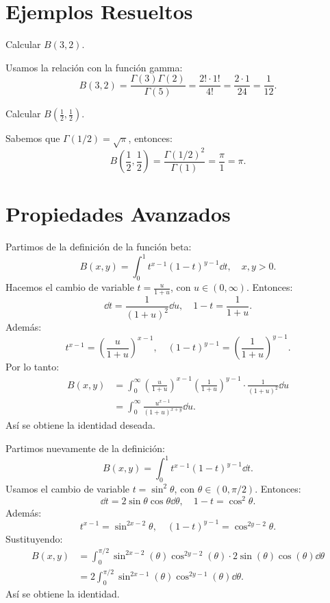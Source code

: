 \section{Ejemplos Resueltos}

\begin{example}
	Calcular \( B(3,2) \).

	Usamos la relación con la función gamma:
	\[
		B(3,2) = \frac{\Gamma(3)\Gamma(2)}{\Gamma(5)} = \frac{2! \cdot 1!}{4!} = \frac{2 \cdot 1}{24} = \frac{1}{12}.
	\]
\end{example}

\begin{example}
	Calcular \( B\left(\frac{1}{2}, \frac{1}{2}\right) \).

	Sabemos que \( \Gamma(1/2) = \sqrt{\pi} \), entonces:
	\[
		B\left(\frac{1}{2}, \frac{1}{2}\right) = \frac{\Gamma(1/2)^2}{\Gamma(1)} = \frac{\pi}{1} = \pi.
	\]
\end{example}

\section{Propiedades Avanzados}
\mprop{}{
	\[
		B(x, y) = \int_0^\infty \frac{t^{x-1}}{(1 + t)^{x+y}} \dd{t}
	\]
}
\begin{myproof}
	Partimos de la definición de la función beta:
	\[
		B(x, y) = \int_0^1 t^{x-1}(1 - t)^{y-1} \dd{t}, \quad x, y > 0.
	\]
	Hacemos el cambio de variable \( t = \frac{u}{1+u} \), con \( u \in (0, \infty) \). Entonces:
	\[
		\dd{t} = \frac{1}{(1+u)^2} \dd{u}, \quad 1 - t = \frac{1}{1+u}.
	\]
	Además:
	\[
		t^{x-1} = \left( \frac{u}{1+u} \right)^{x-1}, \quad (1 - t)^{y-1} = \left( \frac{1}{1+u} \right)^{y-1}.
	\]
	Por lo tanto:
	\begin{align*}
		B(x, y) & = \int_0^\infty \left( \frac{u}{1+u} \right)^{x-1} \left( \frac{1}{1+u} \right)^{y-1} \cdot \frac{1}{(1+u)^2} \dd{u} \\
		        & = \int_0^\infty \frac{u^{x-1}}{(1+u)^{x + y}} \dd{u}.
	\end{align*}
	Así se obtiene la identidad deseada.
\end{myproof}

\mprop{}{
	\[
		B(x, y) = 2 \int_0^{\pi/2} \cos^{2x-1}(t) \sin^{2y-1}(t) \dd{t}
	\]
}
\begin{myproof}
	Partimos nuevamente de la definición:
	\[
		B(x, y) = \int_0^1 t^{x-1}(1 - t)^{y-1} \dd{t}.
	\]
	Usamos el cambio de variable \( t = \sin^2 \theta \), con \( \theta \in (0, \pi/2) \). Entonces:
	\[
		\dd{t} = 2\sin\theta\cos\theta \dd{\theta}, \quad 1 - t = \cos^2\theta.
	\]
	Además:
	\[
		t^{x-1} = \sin^{2x - 2} \theta, \quad (1 - t)^{y-1} = \cos^{2y - 2} \theta.
	\]
	Sustituyendo:
	\begin{align*}
		B(x, y) & = \int_0^{\pi/2} \sin^{2x - 2}(\theta) \cos^{2y - 2}(\theta) \cdot 2\sin(\theta)\cos(\theta) \dd{\theta} \\
		        & = 2 \int_0^{\pi/2} \sin^{2x - 1}(\theta) \cos^{2y - 1}(\theta) \dd{\theta}.
	\end{align*}
	Así se obtiene la identidad.
\end{myproof}

